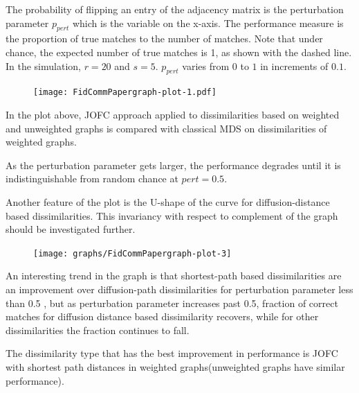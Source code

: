 \documentclass[12pt,oneside,final]{thesis}\usepackage[]{graphicx}\usepackage[]{color}
\begin{document}
  The probability of flipping an entry of the adjacency matrix is the perturbation parameter $p_{pert}$ which is the variable on the x-axis. 
  The performance measure is the proportion of true matches to the number of matches. Note that 
  under chance, the expected number of true matches is 1, as shown with the dashed line. In the simulation, $r=20$ and $s=5$. $p_{pert}$ varies from $0$ to $1$ in increments of $0.1$. 
\begin{figure}
  \texttt{[image: FidCommPapergraph-plot-1.pdf]}
\end{figure}


In the plot above, JOFC approach applied to  dissimilarities based on weighted and unweighted graphs is compared with classical MDS on dissimilarities of weighted graphs.

As the perturbation parameter gets larger, the performance degrades until it is indistinguishable from random chance at $pert=0.5$.

Another feature of the plot is the U-shape of the curve for diffusion-distance based dissimilarities. This invariancy with respect to complement of the graph should be investigated further.

  

\begin{figure}
\centering
\texttt{[image: graphs/FidCommPapergraph-plot-3]} 
\end{figure}



An interesting trend in the graph is that shortest-path based dissimilarities are an improvement over diffusion-path dissimilarities for perturbation parameter less than 0.5 , but as perturbation parameter increases past 0.5, fraction of correct matches for diffusion distance based dissimilarity recovers, while for other dissimilarities the fraction continues to fall. 

The dissimilarity type that has the best improvement in performance is JOFC with shortest path distances in weighted graphs(unweighted graphs have similar performance).
\end{document}
